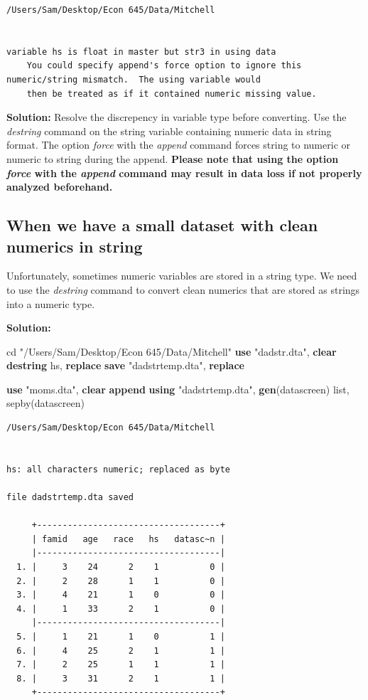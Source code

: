 \documentclass[
]{book}
\newenvironment{Shaded}{\begin{snugshade}}{\end{snugshade}}
\newcommand{\KeywordTok}[1]{\textcolor[rgb]{0.13,0.29,0.53}{\textbf{#1}}}
\newcommand{\NormalTok}[1]{#1}
\newcommand{\OtherTok}[1]{\textcolor[rgb]{0.56,0.35,0.01}{#1}}
\newcommand{\StringTok}[1]{\textcolor[rgb]{0.31,0.60,0.02}{#1}}
\begin{document}
\begin{verbatim}
/Users/Sam/Desktop/Econ 645/Data/Mitchell


variable hs is float in master but str3 in using data
    You could specify append's force option to ignore this numeric/string mismatch.  The using variable would
    then be treated as if it contained numeric missing value.
\end{verbatim}

\textbf{Solution:}
Resolve the discrepency in variable type before converting. Use the \emph{destring} command on the string variable containing numeric data in string format. The option \emph{force} with the \emph{append} command forces string to numeric or numeric to string during the append. \textbf{Please note that using the option \emph{force} with the \emph{append} command may result in data loss if not properly analyzed beforehand.}

\subsection{When we have a small dataset with clean numerics in string}\label{when-we-have-a-small-dataset-with-clean-numerics-in-string}

Unfortunately, sometimes numeric variables are stored in a string type. We need to use the \emph{destring} command to convert clean numerics that are stored as strings into a numeric type.

\textbf{Solution:}

\begin{Shaded}
\begin{Highlighting}[]
\NormalTok{cd }\StringTok{"/Users/Sam/Desktop/Econ 645/Data/Mitchell"}
\KeywordTok{use} \StringTok{"dadstr.dta"}\NormalTok{, }\KeywordTok{clear}
\KeywordTok{destring}\NormalTok{ hs, }\KeywordTok{replace}
\KeywordTok{save} \StringTok{"dadstrtemp.dta"}\NormalTok{, }\KeywordTok{replace}

\KeywordTok{use} \StringTok{"moms.dta"}\NormalTok{, }\KeywordTok{clear}
\KeywordTok{append} \KeywordTok{using} \StringTok{"dadstrtemp.dta"}\NormalTok{, }\KeywordTok{gen}\NormalTok{(datascreen)}
\OtherTok{list}\NormalTok{, sepby(datascreen)}
\end{Highlighting}
\end{Shaded}

\begin{verbatim}
/Users/Sam/Desktop/Econ 645/Data/Mitchell


hs: all characters numeric; replaced as byte

file dadstrtemp.dta saved

     +------------------------------------+
     | famid   age   race   hs   datasc~n |
     |------------------------------------|
  1. |     3    24      2    1          0 |
  2. |     2    28      1    1          0 |
  3. |     4    21      1    0          0 |
  4. |     1    33      2    1          0 |
     |------------------------------------|
  5. |     1    21      1    0          1 |
  6. |     4    25      2    1          1 |
  7. |     2    25      1    1          1 |
  8. |     3    31      2    1          1 |
     +------------------------------------+
\end{verbatim}
\end{document}
